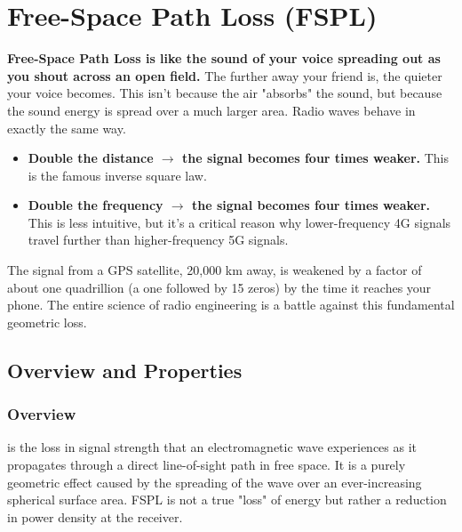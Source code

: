 
\chapter{Free-Space Path Loss (FSPL)}
\label{ch:fspl}

\begin{nontechnical}
    \textbf{Free-Space Path Loss is like the sound of your voice spreading out as you shout across an open field.} The further away your friend is, the quieter your voice becomes. This isn't because the air "absorbs" the sound, but because the sound energy is spread over a much larger area. Radio waves behave in exactly the same way.

    \begin{itemize}
        \item \textbf{Double the distance $\rightarrow$ the signal becomes four times weaker.} This is the famous inverse square law.
        \item \textbf{Double the frequency $\rightarrow$ the signal becomes four times weaker.} This is less intuitive, but it's a critical reason why lower-frequency 4G signals travel further than higher-frequency 5G signals.
    \end{itemize}

     The signal from a GPS satellite, 20,000 km away, is weakened by a factor of about one quadrillion (a one followed by 15 zeros) by the time it reaches your phone. The entire science of radio engineering is a battle against this fundamental geometric loss.
\end{nontechnical}


\section{Overview and Properties}

\subsection{Overview}

 is the loss in signal strength that an electromagnetic wave experiences as it propagates through a direct line-of-sight path in free space. It is a purely geometric effect caused by the spreading of the wave over an ever-increasing spherical surface area. FSPL is not a true "loss" of energy but rather a reduction in power density at the receiver.

